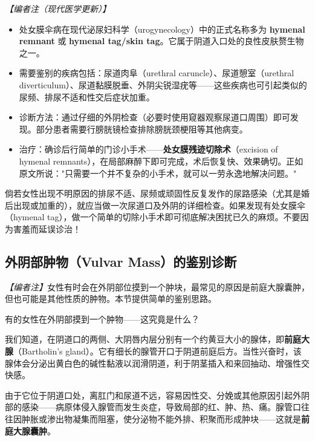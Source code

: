 \begin{enumerate}
\noindent\textit{【编者注（现代医学更新）】}
\begin{itemize}
	\item 处女膜伞病在现代泌尿妇科学（urogynecology）中的正式名称多为 \textbf{hymenal remnant} 或 \textbf{hymenal tag/skin tag}。它属于阴道入口处的良性皮肤赘生物之一。
	\item 需要鉴别的疾病包括：尿道肉阜（urethral caruncle）、尿道憩室（urethral diverticulum）、尿道黏膜脱垂、外阴尖锐湿疣等——这些疾病也可引起类似的尿频、排尿不适和性交后症状加重。
	\item 诊断方法：通过仔细的外阴检查（必要时使用窥器观察尿道口周围）即可发现。部分患者需要行膀胱镜检查排除膀胱颈梗阻等其他病变。
	\item 治疗：确诊后行简单的门诊小手术——\textbf{处女膜残迹切除术}（excision of hymenal remnants），在局部麻醉下即可完成，术后恢复快、效果确切。正如原文所说："只需要一个并不复杂的小手术，就可以一劳永逸地解决问题。"
\end{itemize}

\begin{tcolorbox}[colback=pink!5!white,colframe=red!50!black,title=贴心小叮咛]
倘若女性出现不明原因的排尿不适、尿频或顽固性反复发作的尿路感染（尤其是婚后出现或加重的），就应当做一次尿道口及外阴的详细检查。如果发现有处女膜伞（hymenal tag），做一个简单的切除小手术即可彻底解决困扰已久的麻烦。不要因为害羞而延误诊治！
\end{tcolorbox}

\subsection{外阴部肿物（Vulvar Mass）的鉴别诊断}

\noindent\textit{【编者注】}女性有时会在外阴部位摸到一个肿块，最常见的原因是前庭大腺囊肿，但也可能是其他性质的肿物。本节提供简单的鉴别思路。

\vspace{0.5em}
有的女性在外阴部摸到一个肿物——这究竟是什么？

\vspace{0.5em}
我们知道，在阴道口的两侧、大阴唇内层分别有一个约黄豆大小的腺体，即\textbf{前庭大腺}（Bartholin's gland）。它有细长的腺管开口于阴道前庭后方。当性兴奋时，该腺体会分泌出黄白色的碱性黏液以润滑阴道，利于阴茎插入和来回抽动、增强性交快感。

由于它位于阴道口处，离肛门和尿道不远，容易因性交、分娩或其他原因引起外阴部的感染——病原体侵入腺管而发生炎症，导致局部的红、肿、热、痛。腺管口往往因肿胀或渗出物凝集而阻塞，使分泌物不能外排、积聚而形成肿块——这就是\textbf{前庭大腺囊肿}。


\end{enumerate}
